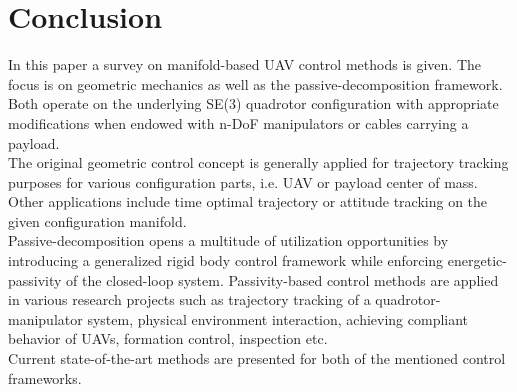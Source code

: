 \section{Conclusion} \label{section:conclusion}
In this paper a survey on manifold-based UAV control methods is given. The focus is on geometric mechanics as well as the passive-decomposition framework. Both operate on the underlying SE(3) quadrotor configuration with appropriate modifications when endowed with n-DoF manipulators or cables carrying a payload. \\
The original geometric control concept is generally applied for trajectory tracking purposes for various configuration parts, i.e. UAV or payload center of mass. Other applications include time optimal trajectory or attitude tracking on the given configuration manifold. \\
Passive-decomposition opens a multitude of utilization opportunities by introducing a generalized rigid body control framework while enforcing energetic-passivity of the closed-loop system. Passivity-based control methods are applied in various research projects such as trajectory tracking of a quadrotor-manipulator system, physical environment interaction, achieving compliant behavior of UAVs, formation control, inspection etc. \\
Current state-of-the-art methods are presented for both of the mentioned control frameworks.